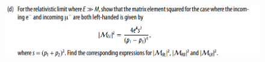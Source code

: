 \documentclass[11pt]{article}
\theoremstyle{definition}
\begin{document}









\newpage
\begin{figure}[H]
    \centering
    \includegraphics[scale = 0.5]{6.7d.png}
\end{figure}
\end{document}
